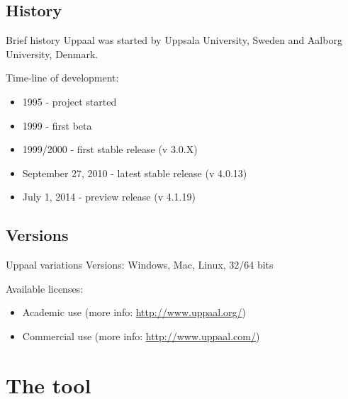 \documentclass{beamer}
\begin{document}
\subsection{History}
\begin{frame}{Brief history}
	Uppaal was started by Uppsala University, Sweden and Aalborg University, Denmark.
	
	Time-line of development:
	\begin{itemize}
		\item 1995 - project started
		\item 1999 - first beta
		\item 1999/2000 - first stable release (v 3.0.X)
		\item September 27, 2010 - latest stable release (v 4.0.13)
		\item July 1, 2014 - preview release (v 4.1.19)
	\end{itemize}
	
\end{frame}

\subsection{Versions}
\begin{frame}{Uppaal variations}
	Versions: Windows, Mac, Linux, 32/64 bits
	
	Available licenses:
	\begin{itemize}
		\item Academic use (more info: \href{http://www.uppaal.org/}{http://www.uppaal.org/})
		\item Commercial use (more info: \href{http://www.uppaal.com/}{http://www.uppaal.com/})
	\end{itemize}
\end{frame}

\section{The tool}
\end{document}
